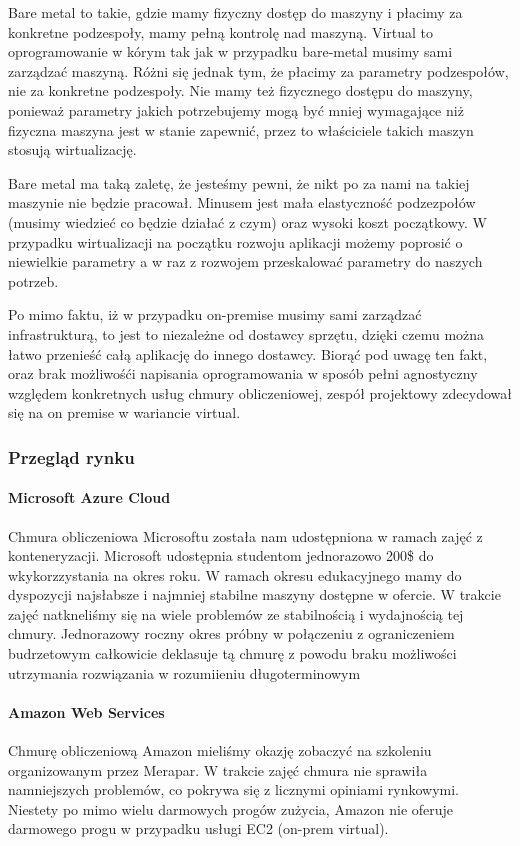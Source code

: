 Bare metal to takie, gdzie mamy fizyczny dostęp do maszyny i płacimy za konkretne podzespoły, mamy pełną kontrolę nad maszyną.
Virtual to oprogramowanie w kórym tak jak w przypadku bare-metal musimy sami zarządzać maszyną.
Różni się jednak tym, że płacimy za parametry podzespołów, nie za konkretne podzespoły.
Nie mamy też fizycznego dostępu do maszyny, ponieważ parametry jakich potrzebujemy mogą być mniej wymagające niż fizyczna maszyna jest w stanie zapewnić, przez to właściciele takich maszyn stosują wirtualizację.

Bare metal ma taką zaletę, że jesteśmy pewni, że nikt po za nami na takiej maszynie nie będzie pracował.
Minusem jest mała elastyczność podzezpołów (musimy wiedzieć co będzie działać z czym) oraz wysoki koszt początkowy.
W przypadku wirtualizacji na początku rozwoju aplikacji możemy poprosić o niewielkie parametry a w raz z rozwojem przeskalować parametry do naszych potrzeb.

Po mimo faktu, iż w przypadku on-premise musimy sami zarządzać infrastrukturą, to jest to niezależne od dostawcy sprzętu, dzięki czemu można łatwo przenieść całą aplikację do innego dostawcy.
Biorąć pod uwagę ten fakt, oraz brak możliwośći napisania oprogramowania w sposób pełni agnostyczny względem konkretnych usług chmury obliczeniowej, zespół projektowy zdecydował się na on premise w wariancie virtual.

\subsubsection{Przegląd rynku}
\paragraph{Microsoft Azure Cloud}
Chmura obliczeniowa Microsoftu została nam udostępniona w ramach zajęć z konteneryzacji.
Microsoft udostępnia studentom jednorazowo 200\$ do wkykorzzystania na okres roku.
W ramach okresu edukacyjnego mamy do dyspozycji najsłabsze i najmniej stabilne maszyny dostępne w ofercie.
W trakcie zajęć natkneliśmy się na wiele problemów ze stabilnością i wydajnością tej chmury.
Jednorazowy roczny okres próbny w połączeniu z ograniczeniem budrzetowym całkowicie deklasuje tą chmurę z powodu braku możliwości utrzymania rozwiązania w rozumiieniu długoterminowym

\paragraph{Amazon Web Services}
Chmurę obliczeniową Amazon mieliśmy okazję zobaczyć na szkoleniu organizowanym przez Merapar.
W trakcie zajęć chmura nie sprawiła namniejszych problemów, co pokrywa się z licznymi opiniami rynkowymi.
Niestety po mimo wielu darmowych progów zużycia, Amazon nie oferuje darmowego progu w przypadku usługi EC2 (on-prem virtual).

